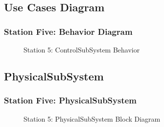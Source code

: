 \documentclass{beamer}
\begin{document}
\subsection{Use Cases Diagram}
\begin{frame}[fragile]
\frametitle{Station Five: Behavior Diagram}
\begin{figure}
	\centering
	\caption{Station 5: ControlSubSystem Behavior}
	\label{dia:behavior}
\end{figure}
\end{frame}


\subsection{PhysicalSubSystem}
\begin{frame}[fragile]
\frametitle{Station Five: PhysicalSubSystem}
\begin{figure}
	\centering
	\caption{Station 5: PhysicalSubSystem Block Diagram}
	\label{dia:physicalss}
\end{figure}
\end{frame}
\end{document}
